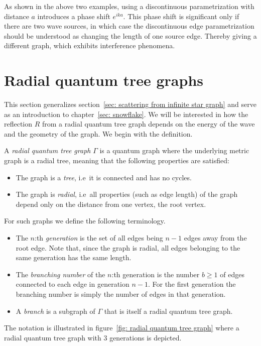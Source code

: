 \begin{lemma}
  As shown in the above two examples, using a discontinuous parametrization with distance $a$ introduces a phase shift $e^{ika}$. This phase shift is significant only if there are two wave sources, in which case the discontinuous edge parametrization should be understood as changing the length of one source edge. Thereby giving a different graph, which exhibits interference phenomena.
\end{lemma}



\section{Radial quantum tree graphs}\label{sec: radial graphs}

This section generalizes section~\ref{sec: scattering from infinite star graph} and serve as an introduction to chapter~\ref{sec: snowflake}. We will be interested in how the reflection $R$ from a radial quantum tree graph depends on the energy of the wave and the geometry of the graph. We begin with the definition.

\begin{definition}\label{def: radial quantum tree graph}
  A \emph{radial quantum tree graph} $\Gamma$ is a quantum graph where the underlying metric graph is a radial tree, meaning that the following properties are satisfied:
  \begin{itemize}
    \item The graph is a \emph{tree}, i.e\ it is connected and has no cycles.
    \item The graph is \emph{radial}, i.e\ all properties (such as edge length) of the graph depend only on the distance from one vertex, the root vertex.
  \end{itemize}
  For such graphs we define the following terminology.
  \begin{itemize}
    \item The $n$:th \emph{generation} is the set of all edges being $n-1$ edges away from the root edge. Note that, since the graph is radial, all edges belonging to the same generation has the same length.
    \item The \emph{branching number} of the $n$:th generation is the number $b \ge 1$ of edges connected to each edge in generation $n-1$. For the first generation the branching number is simply the number of edges in that generation.
    \item A \emph{branch} is a subgraph of $\Gamma$ that is itself a radial quantum tree graph.
  \end{itemize}
  The notation is illustrated in figure~\ref{fig: radial quantum tree graph} where a radial quantum tree graph with 3 generations is depicted.
\end{definition}

